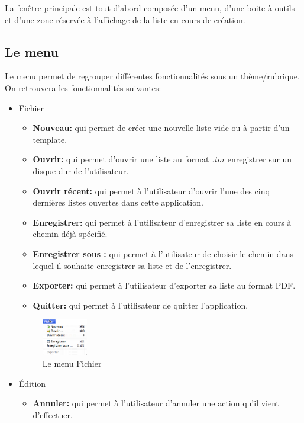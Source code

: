 \documentclass[a4paper,10pt]{article}
\begin{document}
La fenêtre principale est tout d'abord composée d'un menu, d'une boite à outils et d'une zone réservée à l'affichage de la liste en cours de création.

\subsection{Le menu}
Le menu permet de regrouper différentes fonctionnalités sous un thème/rubrique.
On retrouvera les fonctionnalités suivantes:
\begin{itemize}
\item Fichier
\begin{itemize}
\item \textbf{Nouveau:} qui permet de créer une nouvelle liste vide ou à partir d'un template.
\item \textbf{Ouvrir:} qui permet d'ouvrir une liste au format \textit{.tor} enregistrer sur un disque dur de l'utilisateur.
\item \textbf{Ouvrir récent:} qui permet à l'utilisateur d'ouvrir l'une des cinq dernières listes ouvertes dans cette application.
\item \textbf{Enregistrer:} qui permet à l'utilisateur d'enregistrer sa liste en cours à chemin déjà spécifié.
\item \textbf{Enregistrer sous :} qui permet à l'utilisateur de choisir le chemin dans lequel il souhaite enregistrer sa liste et de l'enregistrer.
\item \textbf{Exporter:} qui permet à l'utilisateur d'exporter sa liste au format PDF.
\item \textbf{Quitter:} qui permet à l'utilisateur de quitter l'application.
\end{itemize}
\begin{figure}[H]
    \center
    \includegraphics[width=2cm]{Images/menuFichier.png}
    \caption{Le menu Fichier}
\end{figure}
\item Édition
\begin{itemize}
\item \textbf{Annuler:} qui permet à l'utilisateur d'annuler une action qu'il vient d'effectuer.

\end{itemize}
\end{itemize}
\end{document}
